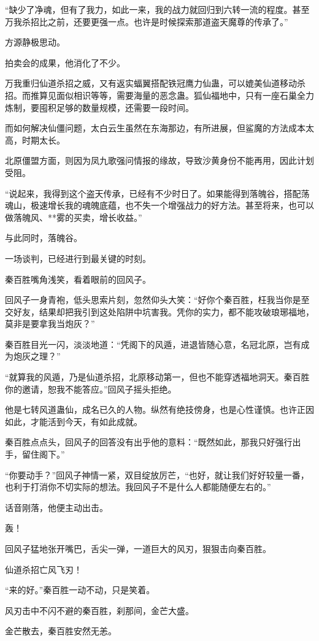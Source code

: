 \begin{this_body}
“缺少了净魂，但有了我力，如此一来，我的战力就回归到六转一流的程度。甚至万我杀招比之前，还要更强一点。也许是时候探索那道盗天魔尊的传承了。”

方源静极思动。

拍卖会的成果，他消化了不少。

万我重归仙道杀招之威，又有返实蝠翼搭配铁冠鹰力仙蛊，可以媲美仙道移动杀招。而推算见面似相识等等，需要海量的恶念蛊。狐仙福地中，只有一座石巢全力炼制，要囤积足够的数量规模，还需要一段时间。

而如何解决仙僵问题，太白云生虽然在东海那边，有所进展，但鲨魔的方法成本太高，时期太长。

北原僵盟方面，则因为凤九歌强问情报的缘故，导致沙黄身份不能再用，因此计划受阻。

“说起来，我得到这个盗天传承，已经有不少时日了。如果能得到落魄谷，搭配荡魂山，极速增长我的魂魄底蕴，也不失一个增强战力的好方法。甚至将来，也可以做落魄风、**雾的买卖，增长收益。”

与此同时，落魄谷。

一场谈判，已经进行到最关键的时刻。

秦百胜嘴角浅笑，看着眼前的回风子。

回风子一身青袍，低头思索片刻，忽然仰头大笑：“好你个秦百胜，枉我当你是至交好友，结果却把我引到这处陷阱中坑害我。凭你的实力，都不能攻破琅琊福地，莫非是要拿我当炮灰？”

秦百胜目光一闪，淡淡地道：“凭阁下的风遁，进退皆随心意，名冠北原，岂有成为炮灰之理？”

“就算我的风遁，乃是仙道杀招，北原移动第一，但也不能穿透福地洞天。秦百胜你的邀请，恕我不能答应。”回风子摇头拒绝。

他是七转风道蛊仙，成名已久的人物。纵然有绝技傍身，也是心性谨慎。也许正因如此，才能活到今天，有如此成就。

秦百胜点点头，回风子的回答没有出乎他的意料：“既然如此，那我只好强行出手，留住阁下。”

“你要动手？”回风子神情一紧，双目绽放厉芒，“也好，就让我们好好较量一番，也利于打消你不切实际的想法。我回风子不是什么人都能随便左右的。”

话音刚落，他便主动出击。

轰！

回风子猛地张开嘴巴，舌尖一弹，一道巨大的风刃，狠狠击向秦百胜。

仙道杀招亡风飞刃！

“来的好。”秦百胜一动不动，只是笑着。

风刃击中不闪不避的秦百胜，刹那间，金芒大盛。

金芒散去，秦百胜安然无恙。


\end{this_body}
